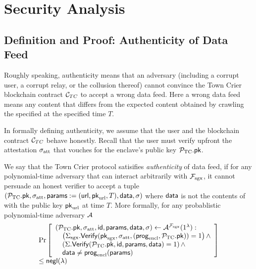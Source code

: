 \section{Security Analysis}


\subsection{Definition and Proof: Authenticity of Data Feed}
Roughly speaking, authenticity means that 
an adversary (including a corrupt
user, a corrupt relay, or the collusion thereof)
cannot convince   
the Town Crier blockchain contract 
${\cal C}_{TC}$ to accept 
a wrong data feed. 
Here a wrong data feed means any content
that differs from the expected content
obtained by crawling the specified \weburl at 
the specified time $T$.

In formally defining 
authenticity, 
we assume that the user and the blockchain
contract ${\cal C}_{TC}$ behave honestly.
Recall that the user must verify 
upfront the attestation ${\sigma_{\textrm{att}}}$ 
that vouches 
for the enclave's public key ${\mathcal{P}}_{\text{TC}}.{\sf pk}$.


\begin{definition}[Authenticity]
We say that the Town Crier protocol 
satisifies {\it authenticity} of data feed,
if for any polynomial-time adversary
that can interact arbitrarily with $\mathcal{F}_{\textrm{sgx}}$,
it cannot 
persuade an honest verifier to accept
a tuple $({\mathcal{P}}_{\text{TC}}.{\sf pk}, {\sigma_{\textrm{att}}}, {\sf params}:=({{\sf url}}, {\sf pk}_{\textrm{url}}, T), {\sf data}, \sigma)$
where ${\sf data}$ is not 
the contents of 
\weburl with the public key ${\sf pk}_{\textrm{url}}$ at time $T$.
More formally, 
for any probablistic polynomial-time adversary $\mathcal{A}$
\[
\begin{array}{l}
\Pr\left[
\begin{array}{l}
({\mathcal{P}}_{\text{TC}}.{\sf pk}, {\sigma_{\textrm{att}}}, {\sf id}, {\sf params}, {\sf data}, \sigma) \leftarrow 
\mathcal{A}^{\mathcal{F}_{\textrm{sgx}}}(1^\lambda) :\\
\quad \left({\Sigma_{\textrm{sgx}}}.{\sf Verify}({\sf pk}_{\mathrm{sgx}}, {\sigma_{\textrm{att}}}, ({\sf prog}_{\textrm{encl}}, {\mathcal{P}}_{\text{TC}}.{\sf pk})) = 1\right) \wedge \\
\quad \left(\Sigma.{\sf Verify}({\mathcal{P}}_{\text{TC}}.{\sf pk}, {\sf id}, {\sf params}, {\sf data})  = 1\right) \wedge\\
\quad {\sf data} \neq {\sf prog}_{\textrm{encl}}({\sf params}) 
\end{array}
\right] \\[3pt] 
\leq {\sf negl}(\lambda)
\end{array}
\]
\label{defn:auth}
\end{definition}


